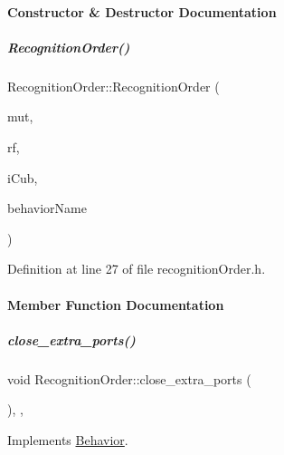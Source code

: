\paragraph{Constructor \& Destructor Documentation}
\mbox{\label{group__behaviorManager_a465b3e91f617df73f606e4ec24c6e12b}} 
\subparagraph{\texorpdfstring{Recognition\+Order()}{RecognitionOrder()}}
{\footnotesize\ttfamily Recognition\+Order\+::\+Recognition\+Order (\begin{DoxyParamCaption}\item[{yarp\+::os\+::\+Mutex $\ast$}]{mut,  }\item[{yarp\+::os\+::\+Resource\+Finder \&}]{rf,  }\item[{\hyperlink{group__icubclient__clients_classicubclient_1_1ICubClient}{icubclient\+::\+I\+Cub\+Client} $\ast$}]{i\+Cub,  }\item[{std\+::string}]{behavior\+Name }\end{DoxyParamCaption})\hspace{0.3cm}{\ttfamily [inline]}}



Definition at line 27 of file recognition\+Order.\+h.



\paragraph{Member Function Documentation}
\mbox{\label{group__behaviorManager_aa5b70feb16d8c7b5eb883f503c96f9fa}} 
\subparagraph{\texorpdfstring{close\+\_\+extra\+\_\+ports()}{close\_extra\_ports()}}
{\footnotesize\ttfamily void Recognition\+Order\+::close\+\_\+extra\+\_\+ports (\begin{DoxyParamCaption}{ }\end{DoxyParamCaption})\hspace{0.3cm}{\ttfamily [inline]}, {\ttfamily [protected]}, {\ttfamily [virtual]}}



Implements \hyperlink{group__behaviorManager_affd22d1516cd32ff4f42694a1e6f9ab1}{Behavior}.



